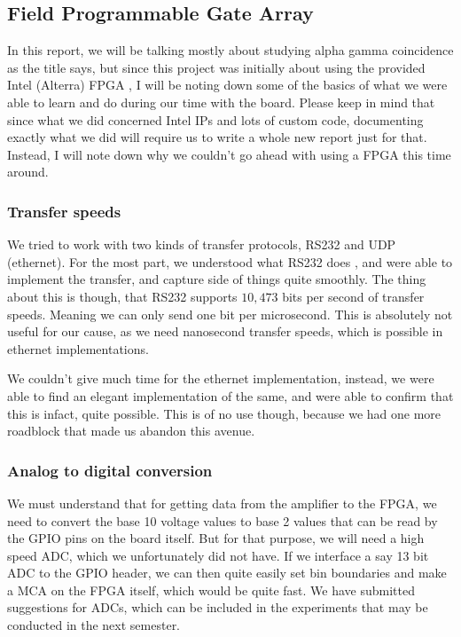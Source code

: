 \documentclass{double}
\begin{document}
\begin{multicols*}{2}
\subsection{Field Programmable Gate Array}
In this report, we will be talking mostly about studying alpha gamma coincidence as the title says, but since this project was initially about using the
provided Intel (Alterra) FPGA \cite{alterra}, I will be noting down some of the basics of what we were able to learn and do during our time with the board. Please keep in mind that since what we did concerned Intel IPs and lots of custom code, documenting exactly what we did will require us to write a whole new report just for that. Instead, I will note down why we couldn't go ahead with using a FPGA this time around. 

\subsubsection{Transfer speeds} We tried to work with two
kinds of transfer protocols, RS232 and UDP (ethernet). For
the most part, we understood what RS232 does \cite{fpga}, and were able to implement the transfer, and capture side of things quite smoothly. The thing about this is though, that RS232 supports $10,473$ bits per second of transfer speeds. Meaning we can only send one bit per microsecond. This is absolutely not useful for our cause, as we need nanosecond transfer speeds, which is possible in ethernet implementations.

We couldn't give much time for the ethernet implementation, instead, we were able to find an elegant implementation of the same, and were able to confirm that this is infact, quite possible. This is of no use though, because we had one more roadblock that made us abandon this avenue.

\subsubsection{Analog to digital conversion} We must understand that for getting data from the amplifier to the FPGA, we need to convert the base 10 voltage values to base 2 values that can be read by the GPIO pins on the board itself. But for that purpose, we will need a high speed ADC, which we unfortunately did not have. If we interface a say 13 bit ADC to the GPIO header, we can then quite easily set bin boundaries and make a MCA on the FPGA itself, which would be quite fast. We have submitted suggestions for ADCs, which can be included in the experiments that may be conducted in the next semester.



\end{multicols*}
\end{document}
